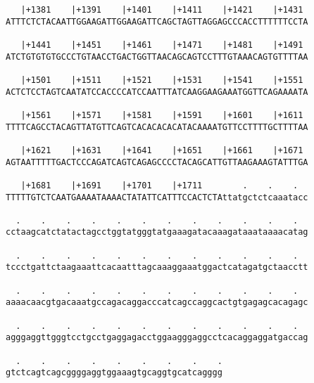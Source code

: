\documentclass{article}
\begin{document}
\begin{Verbatim}
   |+1381    |+1391    |+1401    |+1411    |+1421    |+1431 
ATTTCTCTACAATTGGAAGATTGGAAGATTCAGCTAGTTAGGAGCCCACCTTTTTTCCTA
                                                            
   |+1441    |+1451    |+1461    |+1471    |+1481    |+1491 
ATCTGTGTGTGCCCTGTAACCTGACTGGTTAACAGCAGTCCTTTGTAAACAGTGTTTTAA
                                                            
   |+1501    |+1511    |+1521    |+1531    |+1541    |+1551 
ACTCTCCTAGTCAATATCCACCCCATCCAATTTATCAAGGAAGAAATGGTTCAGAAAATA
                                                            
   |+1561    |+1571    |+1581    |+1591    |+1601    |+1611 
TTTTCAGCCTACAGTTATGTTCAGTCACACACACATACAAAATGTTCCTTTTGCTTTTAA
                                                            
   |+1621    |+1631    |+1641    |+1651    |+1661    |+1671 
AGTAATTTTTGACTCCCAGATCAGTCAGAGCCCCTACAGCATTGTTAAGAAAGTATTTGA
                                                            
   |+1681    |+1691    |+1701    |+1711        .    .    .  
TTTTTGTCTCAATGAAAATAAAACTATATTCATTTCCACTCTAttatgctctcaaatacc
                                                            
  .    .    .    .    .    .    .    .    .    .    .    .  
cctaagcatctatactagcctggtatgggtatgaaagatacaaagataaataaaacatag
                                                            
  .    .    .    .    .    .    .    .    .    .    .    .  
tccctgattctaagaaattcacaatttagcaaaggaaatggactcatagatgctaacctt
                                                            
  .    .    .    .    .    .    .    .    .    .    .    .  
aaaacaacgtgacaaatgccagacaggacccatcagccaggcactgtgagagcacagagc
                                                            
  .    .    .    .    .    .    .    .    .    .    .    .  
agggaggttgggtcctgcctgaggagacctggaagggaggcctcacaggaggatgaccag
                                                            
  .    .    .    .    .    .    .    .    .
gtctcagtcagcggggaggtggaaagtgcaggtgcatcagggg
                                           
                                           
\end{Verbatim}
\end{document}
